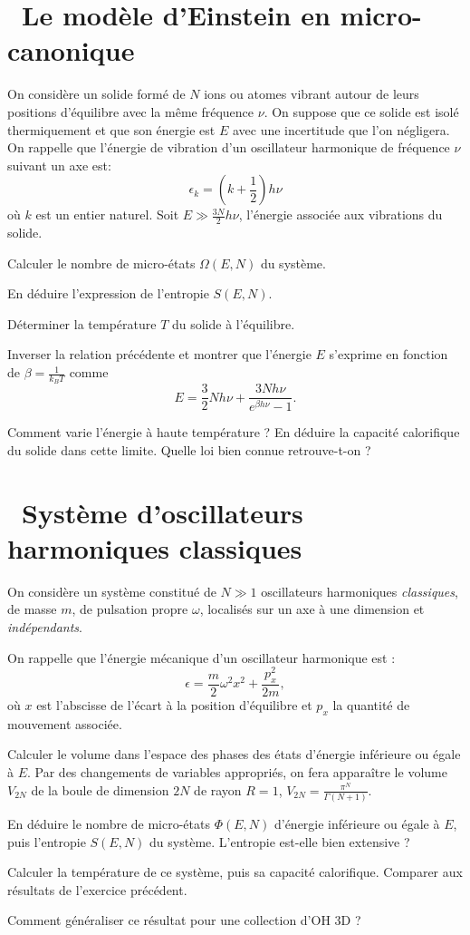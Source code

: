 \documentclass[utf8, 11pt]{feuille}
\begin{document}




\section{\medium~Le modèle d'Einstein en micro-canonique}

On considère un solide formé de $N$ ions ou atomes vibrant autour de leurs positions d'équilibre avec la même fréquence $\nu$. On suppose que ce solide est isolé thermiquement et que son énergie est $E$ avec une incertitude que l'on négligera. On rappelle que l'énergie de vibration d'un oscillateur harmonique de fréquence $\nu$ suivant un axe est:
$$
\epsilon_k=(k+\frac{1}{2}) h \nu
$$
où $k$ est un entier naturel. Soit $E \gg \frac{3N}{2} h \nu$, l'énergie associée aux vibrations du solide.

\question
Calculer le nombre de micro-états $\Omega(E,N)$ du système.

\question
En déduire l'expression de l'entropie $S(E,N)$.

\question
Déterminer la température $T$ du solide à l'équilibre. 

\question
Inverser la relation précédente et montrer que l'énergie $E$ s'exprime en fonction de $\beta=\frac{1}{k_BT}$ comme
$$
E=\frac{3}{2} N h \nu + \frac{3Nh \nu}{e^{\beta h \nu}-1}. \nonumber
$$

\question
Comment varie l'énergie à haute température ? En déduire la capacité calorifique du solide dans cette limite. Quelle loi bien connue retrouve-t-on ?



\section{\medium~Système d'oscillateurs harmoniques classiques}

On considère un système constitué de $N \gg 1$ oscillateurs harmoniques {\it classiques}, de masse $m$, de pulsation propre $\omega$, localisés sur un axe à une dimension et {\it indépendants}.

On rappelle que l'énergie mécanique d'un oscillateur harmonique est :
$$
\epsilon=\frac{m}{2}\omega^2 x^2+\frac{p_x^2}{2m} , \nonumber
$$
où $x$ est l'abscisse de l'écart à la position d'équilibre et $p_x$ la quantité de mouvement associée.

\question
Calculer le volume dans l'espace des phases des états d'énergie inférieure ou égale à $E$. Par des changements de variables appropriés, on fera apparaître le volume $V_{2N}$ de la boule de dimension $2N$ de rayon $R=1$, $V_{2N}=\frac{\pi^N}{\Gamma(N+1)}$.

\question
En déduire le nombre de micro-états $\Phi(E,N)$ d'énergie inférieure ou égale à $E$, puis l'entropie $S(E,N)$ du système. L'entropie est-elle bien extensive ?

\question
Calculer la température de ce système, puis sa capacité calorifique. Comparer aux résultats de l'exercice précédent.

\question
Comment généraliser ce résultat pour une collection d'OH 3D ?
\end{document}
